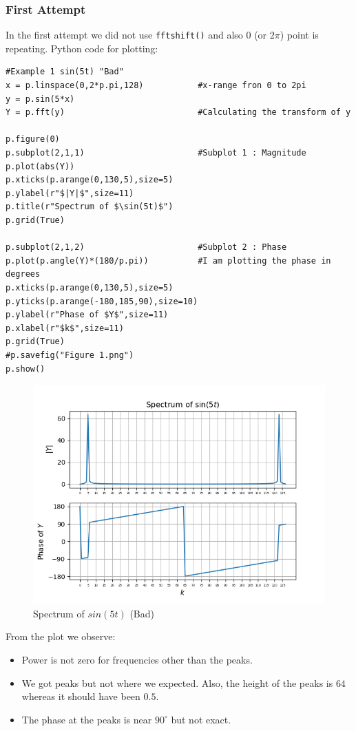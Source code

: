\documentclass[11pt, a4paper]{article}
\begin{document}
        \subsubsection{First Attempt}
        In the first attempt we did not use \texttt{fftshift()} and also $0$ (or $2\pi$) point is repeating. Python code for plotting:
        \begin{verbatim}
#Example 1 sin(5t) "Bad"
x = p.linspace(0,2*p.pi,128)           #x-range fron 0 to 2pi
y = p.sin(5*x)
Y = p.fft(y)                           #Calculating the transform of y

p.figure(0)
p.subplot(2,1,1)                       #Subplot 1 : Magnitude
p.plot(abs(Y))
p.xticks(p.arange(0,130,5),size=5)
p.ylabel(r"$|Y|$",size=11)
p.title(r"Spectrum of $\sin(5t)$")
p.grid(True)

p.subplot(2,1,2)                       #Subplot 2 : Phase
p.plot(p.angle(Y)*(180/p.pi))          #I am plotting the phase in degrees
p.xticks(p.arange(0,130,5),size=5)
p.yticks(p.arange(-180,185,90),size=10)
p.ylabel(r"Phase of $Y$",size=11)
p.xlabel(r"$k$",size=11)
p.grid(True)
#p.savefig("Figure 1.png")
p.show()
        \end{verbatim}
        \begin{figure}[!h]
            \centering
            \includegraphics[scale = 0.7]{Figure 1.png}
            \caption{Spectrum of $sin(5t)$ (Bad)}
            \label{fig:Figure 1}
        \end{figure}
        From the plot we observe:
        \begin{itemize}
            \item Power is not zero for frequencies other than the peaks.
            \item We got peaks but not where we expected. Also, the height of the peaks is $64$ whereas it should have been $0.5$.
            \item The phase at the peaks is near $90^{\circ}$ but not exact.
        \end{itemize}
\end{document}
